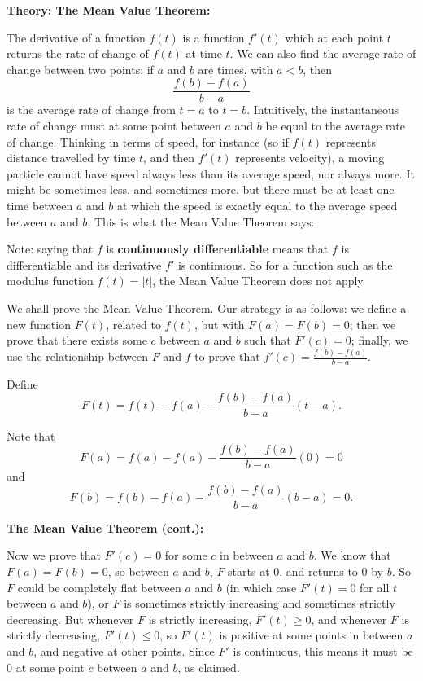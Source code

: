 \documentclass{article}
\begin{document}
{\bf Theory: The Mean Value Theorem:}

\vspace{5mm}

The derivative of a function $f(t)$ is a function $f'(t)$ which at each point $t$ returns the rate of change of $f(t)$ at time $t$. We can also find the average rate of change between two points; if $a$ and $b$ are times, with $a<b$, then
\[\frac{f(b)-f(a)}{b-a}\]
is the average rate of change from $t=a$ to $t=b$. Intuitively, the instantaneous rate of change must at some point between $a$ and $b$ be equal to the average rate of change. Thinking in terms of speed, for instance (so if $f(t)$ represents distance travelled by time $t$, and then $f'(t)$ represents velocity), a moving particle cannot have speed always less than its average speed, nor always more. It might be sometimes less, and sometimes more, but there must be at least one time between $a$ and $b$ at which the speed is exactly equal to the average speed between $a$ and $b$. This is what the Mean Value Theorem says:\bigskip

\noindent{}\bigskip



Note: saying that $f$ is \textbf{continuously differentiable} means that $f$ is differentiable and its derivative $f'$ is continuous. So for a function such as the modulus function $f(t)=|t|$, the Mean Value Theorem does not apply.\bigskip



We shall prove the Mean Value Theorem. Our strategy is as follows: we define a new function $F(t)$, related to $f(t)$, but with $F(a)=F(b)=0$; then we prove that there exists some $c$ between $a$ and $b$ such that $F'(c)=0$; finally, we use the relationship between $F$ and $f$ to prove that $f'(c)=\frac{f(b)-f(a)}{b-a}$.

Define
\[F(t)=f(t)-f(a)-\frac{f(b)-f(a)}{b-a}(t-a).\]

Note that
\[F(a)=f(a)-f(a)-\frac{f(b)-f(a)}{b-a}(0)=0\]
and
\[F(b)=f(b)-f(a)-\frac{f(b)-f(a)}{b-a}(b-a)=0.\]

\bigskip


\textbf{The Mean Value Theorem (cont.):}

\vspace{5mm}

Now we prove that $F'(c)=0$ for some $c$ in between $a$ and $b$. We know that $F(a)=F(b)=0$, so between $a$ and $b$, $F$ starts at 0, and returns to 0 by $b$. So $F$ could be completely flat between $a$ and $b$ (in which case $F'(t)=0$ for all $t$ between $a$ and $b$), or $F$ is sometimes strictly increasing and sometimes strictly decreasing. But whenever $F$ is strictly increasing, $F'(t)\geq 0$, and whenever $F$ is strictly decreasing, $F'(t)\leq 0$, so $F'(t)$ is positive at some points in between $a$ and $b$, and negative at other points. Since $F'$ is continuous, this means it must be 0 at some point $c$ between $a$ and $b$, as claimed.\bigskip
\end{document}
